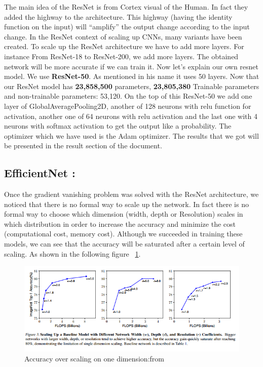 \documentclass[a4paper]{article}
\begin{document}
The main idea of the ResNet is from Cortex visual of the Human. In fact they added the highway to the architecture. This highway (having the identity function on the input) will “amplify” the output change according to the input change.
In the ResNet context of scaling up CNNs, many variants have been created. 
To scale up the ResNet architecture we have to add more layers. For instance  From ResNet-18 to ResNet-200, we add more layers. The obtained network will be more accurate if we can train it. 
Now let’s explain our own resnet model.  We use \textbf{ResNet-50}. As mentioned in his name it uses 50 layers.
Now that our ResNet model has \textbf{23,858,500} parameters, \textbf{23,805,380} Trainable parameters and non-trainable parameters: 53,120. On the top of this ResNet-50 we add one layer of GlobalAveragePooling2D, another of 128 neurons with relu function for activation, another one of 64 neurons with relu activation and the last one with 4 neurons with softmax activation to get the output like a probability.
The optimizer which we have used is the Adam optimizer. 
The results that we got will be presented in the result section of the document.


\subsection{EfficientNet :}

Once the gradient vanishing problem was solved with the ResNet architecture, we noticed that there is no formal way to scale up the network. In fact there is no formal way to choose which dimension (width, depth or Resolution) scales in which distribution in order to increase the accuracy and minimize the cost (computational cost, memory cost).
Although we succeeded in training these models, we can see that the accuracy will be saturated after a certain level of scaling. As shown in the following figure ~\ref{fig:scaling_multi}. 

    \begin{figure}[H]
      \includegraphics[width=\linewidth]{images/scaling_one.png}
      \caption{Accuracy over scaling on one dimension:from \cite{DBLP:journals/corr/abs-1905-11946}}
      \label{fig:scaling_multi}
    \end{figure}
\end{document}
